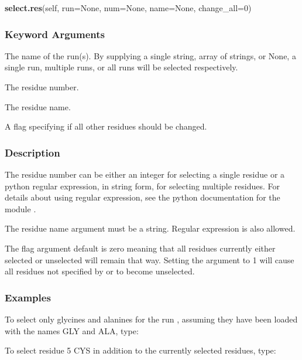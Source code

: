 \textsf{\textbf{select.res}(self, run=None, num=None, name=None, change\_all=0)}


\subsubsection{Keyword Arguments}


  The name of the run(s).  By supplying a single string, array of strings, or None, a single run, multiple runs, or all runs will be selected respectively.

  The residue number.

  The residue name.

  A flag specifying if all other residues should be changed.

\subsubsection{Description}

The residue number can be either an integer for selecting a single residue or a python
regular expression, in string form, for selecting multiple residues.  For details about
using regular expression, see the python documentation for the module 
.

The residue name argument must be a string.  Regular expression is also allowed.

The 
 flag argument default is zero meaning that all residues currently either
selected or unselected will remain that way.  Setting the argument to 1 will cause all
residues not specified by 
 or 
 to become unselected.


\subsubsection{Examples}

To select only glycines and alanines for the run 
, assuming they have been loaded with
the names GLY and ALA, type:




To select residue 5 CYS in addition to the currently selected residues, type:


